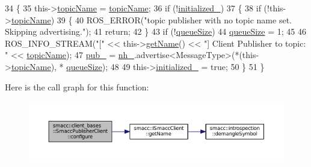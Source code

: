 \begin{DoxyCode}
34   \{
35     this->\hyperlink{classsmacc_1_1client__bases_1_1SmaccPublisherClient_a8b8d98aef9b3b3a441005d2cb17b4fcc}{topicName} = \hyperlink{classsmacc_1_1client__bases_1_1SmaccPublisherClient_a8b8d98aef9b3b3a441005d2cb17b4fcc}{topicName};
36     \textcolor{keywordflow}{if} (!\hyperlink{classsmacc_1_1client__bases_1_1SmaccPublisherClient_acb2fbd8b9797ce286d9ecc0419e2cc55}{initialized\_})
37     \{
38       \textcolor{keywordflow}{if} (!this->\hyperlink{classsmacc_1_1client__bases_1_1SmaccPublisherClient_a8b8d98aef9b3b3a441005d2cb17b4fcc}{topicName})
39       \{
40         ROS\_ERROR(\textcolor{stringliteral}{"topic publisher with no topic name set. Skipping advertising."});
41         \textcolor{keywordflow}{return};
42       \}
43       \textcolor{keywordflow}{if} (!\hyperlink{classsmacc_1_1client__bases_1_1SmaccPublisherClient_a1a9b98681b01953f134191799a029fd3}{queueSize})
44         \hyperlink{classsmacc_1_1client__bases_1_1SmaccPublisherClient_a1a9b98681b01953f134191799a029fd3}{queueSize} = 1;
45 
46       ROS\_INFO\_STREAM(\textcolor{stringliteral}{"["} << this->\hyperlink{classsmacc_1_1ISmaccClient_a20846aabfd1de832aa27d7a8237a1742}{getName}() << \textcolor{stringliteral}{"] Client Publisher to topic: "} << 
      \hyperlink{classsmacc_1_1client__bases_1_1SmaccPublisherClient_a8b8d98aef9b3b3a441005d2cb17b4fcc}{topicName});
47       \hyperlink{classsmacc_1_1client__bases_1_1SmaccPublisherClient_af39f498e73e8f956aae312065a4fd093}{pub\_} = \hyperlink{classsmacc_1_1client__bases_1_1SmaccPublisherClient_a83a44b5a1afd4d45140d4936f4011cc9}{nh\_}.advertise<MessageType>(*(this->\hyperlink{classsmacc_1_1client__bases_1_1SmaccPublisherClient_a8b8d98aef9b3b3a441005d2cb17b4fcc}{topicName}), *
      \hyperlink{classsmacc_1_1client__bases_1_1SmaccPublisherClient_a1a9b98681b01953f134191799a029fd3}{queueSize});
48 
49       this->\hyperlink{classsmacc_1_1client__bases_1_1SmaccPublisherClient_acb2fbd8b9797ce286d9ecc0419e2cc55}{initialized\_} = \textcolor{keyword}{true};
50     \}
51   \}
\end{DoxyCode}


Here is the call graph for this function\+:
\nopagebreak
\begin{figure}[H]
\begin{center}
\leavevmode
\includegraphics[width=350pt]{classsmacc_1_1client__bases_1_1SmaccPublisherClient_ade7a2549ada725b8342633137eb6ad53_cgraph}
\end{center}
\end{figure}



